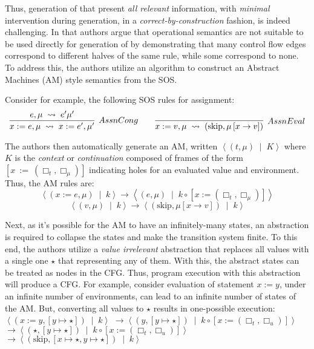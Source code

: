 Thus, generation of \CFGs{} that present \emph{all relevant} information,
with \emph{minimal} intervention during generation, in a
\emph{correct-by-construction} fashion, is indeed challenging.
In \cite{KoppelICFP22} that authors argue that operational semantics
are not suitable to be used directly for generation of \CFGs{} by demonstrating
that many control flow edges correspond to different halves of the same rule,
while some correspond to none. To address this, the authors utilize an algorithm
to construct an Abstract Machines (AM) style semantics from the SOS.

Consider for example, the following SOS rules for assignment:
$$
\infer[AssnCong]
{x := e, \mu\; \leadsto\; x := e^{\prime}, \mu^{\prime}}{e, \mu\; \leadsto\; e^{\prime}\mu^{\prime}}
\quad \quad
\infer[AssnEval]
{x := v,\mu\; \leadsto\; \left(\text{skip}, \mu\left[x \rightarrow v\right]\right)}{}
$$

The authors then automatically generate an AM, written
$\left\langle \left(t, \mu\right) \;\mid\; K\right\rangle$ where $K$ is the
\emph{context} or \emph{continuation} composed of frames of the form $[x\ :=\
(\Box_{t}, \Box_{\mu})]$ indicating holes for an evaluated value and
environment. Thus, the AM rules are:
$$
\left\langle \left( x := e, \mu \right)\;\mid\; k \right\rangle \rightarrow
\left\langle \left( e, \mu \right)\;\mid\; k \circ \left[x := \left(\Box_t,\Box_{\mu}\right) \right]\right\rangle
$$
$$
\left\langle \left( v, \mu \right)\;\mid\; k \right\rangle \rightarrow
\left\langle \left(\text{skip}, \mu\left[x \rightarrow v \right] \right) \;\mid\; k \right\rangle
$$

Next, as it's possible for the AM to have an infinitely-many states, an
abstraction is required to collapse the states and make the transition system
finite. To this end, the authors utilize a \emph{value irrelevant} abstraction
that replaces all values with a single one $\star$ that representing any of
them. With this, the abstract states can be treated as nodes in the CFG.
Thus, program execution with this abstraction will produce a CFG.
For example, consider evaluation of statement $x := y$, under an
infinite number of environments, can lead to an infinite number of
states of the AM.
But, converting all values to $\star$ results in
one-possible execution: $\left\langle \left( x := y, \left[ y \mapsto \star
    \right] \right) \;\mid\; k \right\rangle$
$\rightarrow  \left\langle \left(y, \left[ y \mapsto \star \right] \right) \;\mid\; k \circ \left[ x := \left(\Box_t,\Box_u\right) \right] \right\rangle$
$\rightarrow  \left\langle \left(\star, \left[ y \mapsto \star \right] \right) \;\mid\; k \circ \left[ x := \left(\Box_t,\Box_u\right) \right] \right\rangle$
$\rightarrow  \left\langle \left(\text{skip}, \left[x \mapsto \star, y \mapsto \star \right] \right) \;\mid\; k \right\rangle$

